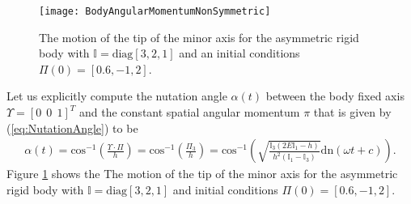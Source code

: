 \documentclass[graybox,envcountchap,sectrefs]{svmonoMuga}
\begin{document}
\begin{figure}[ht]
\begin{center}
\texttt{[image: BodyAngularMomentumNonSymmetric]}
\renewcommand{\baselinestretch}{1}\selectfont
\caption{The motion of the tip of the minor axis for the asymmetric rigid body with $\mathbb{I}=\mathrm{diag}[3,2,1]$ and an initial conditions $\Pi(0)=[0.6,-1,2]$.}
\label{Fig:NonSymmetricRigidBodyNutation}
\renewcommand{\baselinestretch}{1.5}\selectfont
\end{center}
\end{figure}


Let us explicitly compute the  nutation angle $\alpha(t)$
between the body fixed axis $\Upsilon=[0\:\:0\:\:1]^T$ and the constant spatial angular momentum $\pi$ that is given by (\ref{eq:NutationAngle}) to be
\begin{align}
\alpha(t)=\mathrm{cos}^{-1}\left(\frac{\Upsilon \cdot \Pi}{h}\right)=\mathrm{cos}^{-1}\left(\frac{\Pi_3}{h}\right)
=\mathrm{cos}^{-1}\left(\sqrt{\frac{\mathbb{I}_3(2E\mathbb{I}_1-h)}{h^2(\mathbb{I}_1-\mathbb{I}_3)}}\mathrm{dn}(\omega t +c)\right).\label{eq:NutationAngleMinoraxis}
\end{align}
Figure \ref{Fig:NonSymmetricRigidBodyNutation} shows the The motion of the tip of the minor axis for the asymmetric rigid body with $\mathbb{I}=\mathrm{diag}[3,2,1]$ and initial conditions $\Pi(0)=[0.6,-1,2]$.
\end{document}
